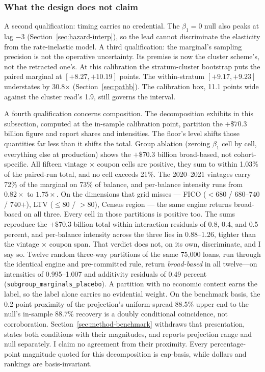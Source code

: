 \documentclass[12pt]{article}
\begin{document}
\subsubsection{What the design does not claim}

A second qualification: timing carries no credential. The $\beta_1 = 0$ null also peaks at lag $-3$ (Section~\ref{sec:hazard-interp}), so the lead cannot discriminate the elasticity from the rate-inelastic model. A third qualification: the marginal's sampling precision is not the operative uncertainty. Its premise is now the cluster scheme's, not the retracted one's. At this calibration the stratum-cluster bootstrap puts the paired marginal at $[+8.27, +10.19]$ points. The within-stratum $[+9.17, +9.23]$ understates by 30.8$\times$ (Section~\ref{sec:pathb}). The calibration box, 11.1 points wide against the cluster read's 1.9, still governs the interval.

A fourth qualification concerns composition. The decomposition exhibits in this subsection, computed at the in-sample calibration point, partition the $+\$70.3$ billion figure and report shares and intensities. The floor's level shifts those quantities far less than it shifts the total. Group ablation (zeroing $\beta_1$ cell by cell, everything else at production) shows the $+\$70.3$ billion broad-based, not cohort-specific. All fifteen vintage $\times$ coupon cells are positive, they sum to within 1.03\% of the paired-run total, and no cell exceeds 21\%. The 2020--2021 vintages carry 72\% of the marginal on 73\% of balance, and per-balance intensity runs from $0.82\times$ to $1.75\times$. On the dimensions that grid misses --- FICO ($<$680 / 680--740 / 740$+$), LTV ($\leq$80 / $>$80), Census region --- the same engine returns broad-based on all three. Every cell in those partitions is positive too. The sums reproduce the $+\$70.3$ billion total within interaction residuals of 0.8, 0.4, and 0.5 percent, and per-balance intensity across the three lies in 0.88--1.26, tighter than the vintage $\times$ coupon span. That verdict does not, on its own, discriminate, and I say so. Twelve random three-way partitions of the same 75,000 loans, run through the identical engine and pre-committed rule, return \emph{broad-based} in all twelve---on intensities of 0.995--1.007 and additivity residuals of 0.49 percent (\texttt{subgroup\_marginals\_placebo}). A partition with no economic content earns the label, so the label alone carries no evidential weight. On the benchmark basis, the 0.2-point proximity of the projection's uniform-spread 88.5\% upper end to the null's in-sample 88.7\% recovery is a doubly conditional coincidence, not corroboration. Section~\ref{sec:method-benchmark} withdraws that presentation, states both conditions with their magnitudes, and reports projection range and null separately. I claim no agreement from their proximity. Every percentage-point magnitude quoted for this decomposition is cap-basis, while dollars and rankings are basis-invariant.
\end{document}
